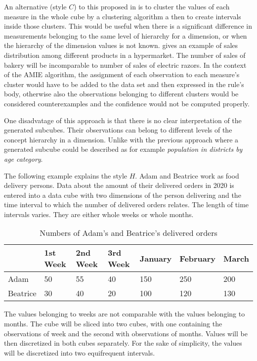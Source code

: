 An alternative (style $C$) to this proposed in \cite{Koukal2017} is to cluster the values of each measure in the whole cube by a clustering algorithm a then to create intervals inside those clusters. This would be useful when there is a significant difference in measurements belonging to the same level of hierarchy for a dimension, or when the hierarchy of the dimension values is not known. \cite{Koukal2017} gives an example of sales distribution among different products in a hypermarket. The number of sales of bakery will be incomparable to number of sales of electric razors. In the context of the AMIE algorithm, the assignment of each observation to each measure's cluster would have to be added to the data set and then expressed in the rule's body, otherwise also the observations belonging to different clusters would be considered counterexamples and the confidence would not be computed properly. 

One disadvatage of this approach is that there is no clear interpretation of the generated subcubes. Their observations can belong to different levels of the concept hierarchy in a dimension. Unlike with the previous approach where a generated subcube could be described as for example \textit{population in districts by age category}.

The following example explains the style $H$. Adam and Beatrice work as food delivery persons. Data about the amount of their delivered orders in 2020 is entered into a data cube with two dimensions of the person delivering and the time interval to which the number of delivered orders relates. The length of time intervals varies. They are either whole weeks or whole months.

\begin{table}[h]
\centering
\begin{tabular}{l|llllll}
         & 1st Week & 2nd Week & 3rd Week & January & February & March  \\ 
\hline
Adam     & 50               & 55               & 40               & 150     & 250      & 200    \\
Beatrice & 30               & 40               & 20               & 100     & 120      & 130   
\end{tabular}
\caption{Numbers of Adam's and Beatrice's delivered orders}\label{table3}
\end{table}

The values belonging to weeks are not comparable with the values belonging to months. The cube will be sliced into two cubes, with one containing the observations of week and the second with observations of months. Values will be then discretized in both cubes separately. For the sake of simplicity, the values will be discretized into two equifrequent intervals.

